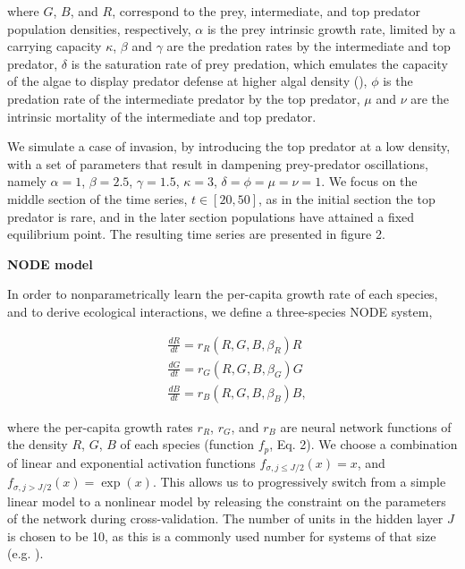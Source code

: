 \documentclass[11pt, oneside]{article}
\begin{document}
where $G$, $B$, and $R$, correspond to the prey, intermediate, and top predator population densities, respectively,
$\alpha$ is the prey intrinsic growth rate, limited by a carrying capacity $\kappa$, 
$\beta$ and $\gamma$ are the predation rates by the intermediate and top predator,
$\delta$ is the saturation rate of prey predation, which emulates the capacity of the algae to display predator defense at higher algal density (\cite{Hiltunen2013}),
$\phi$ is the predation rate of the intermediate predator by the top predator,
$\mu$ and $\nu$ are the intrinsic mortality of the intermediate and top predator.

We simulate a case of invasion, by introducing the top predator at a low density, with a set of parameters that result in dampening prey-predator oscillations, namely $\alpha = 1$, $\beta = 2.5$, $\gamma = 1.5$, $\kappa = 3$, $\delta = \phi = \mu = \nu = 1$.
We focus on the middle section of the time series, $t \in [20,50]$, as in the initial section the top predator is rare, and in the later section populations have attained a fixed equilibrium point.
The resulting time series are presented in figure 2.

\textbf{NODE model}

In order to nonparametrically learn the per-capita growth rate of each species, and to derive ecological interactions, we define a three-species NODE system,

\vspace{-0.5cm}
\begin{equation} \begin{aligned}
	& \frac{dR}{dt} = r_R(R,G,B,\beta_R) R \\
	& \frac{dG}{dt} = r_G(R,G,B,\beta_G) G \\
	& \frac{dB}{dt} = r_B(R,G,B,\beta_B) B,
\end{aligned} \end{equation}

where the per-capita growth rates $r_R$, $r_G$, and $r_B$ are neural network functions of the density $R$, $G$, $B$ of each species (function $f_p$, Eq. 2).
We choose a combination of linear and exponential activation functions $f_{\sigma, j\leq J/2}(x) = x$, and $f_{\sigma, j>J/2}(x) = \exp(x)$.
This allows us to progressively switch from a simple linear model to a nonlinear model by releasing the constraint on the parameters of the network during cross-validation.
The number of units in the hidden layer $J$ is chosen to be 10, as this is a commonly used number for systems of that size (e.g. \cite{Wu2005,Bonnaffe2021a}). 
\end{document}
